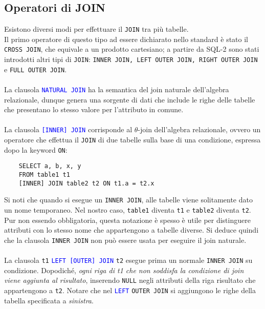 \documentclass[12pt,a4paper]{book}
\begin{document}
	\subsection{Operatori di JOIN}
	Esistono diversi modi per effettuare il \texttt{JOIN} tra più tabelle.\\
	Il primo operatore di questo tipo ad essere dichiarato nello standard è stato il \texttt{CROSS JOIN}, che equivale a un prodotto cartesiano; a partire da SQL-2 sono stati introdotti altri tipi di \texttt{JOIN}: \texttt{INNER JOIN, LEFT OUTER JOIN, RIGHT OUTER JOIN} e \texttt{FULL OUTER JOIN}.
	\paragraph{}La clausola \textcolor{blue}{\texttt{NATURAL JOIN}} ha la semantica del join naturale dell'algebra relazionale, dunque genera una sorgente di dati che include le righe delle tabelle che presentano lo stesso valore per l'attributo in comune.
	\paragraph{}La clausola \textcolor{blue}{\texttt{[INNER] JOIN}} corrisponde al $\theta$-join dell'algebra relazionale, ovvero un operatore che effettua il \texttt{JOIN} di due tabelle sulla base di una condizione, espressa dopo la keyword \texttt{ON}:
	\begin{lstlisting}
	SELECT a, b, x, y
	FROM table1 t1 
	[INNER] JOIN table2 t2 ON t1.a = t2.x
	\end{lstlisting}
	Si noti che quando si esegue un \texttt{INNER JOIN}, alle tabelle viene solitamente dato un nome temporaneo. Nel nostro caso, \texttt{table1} diventa \texttt{t1} e \texttt{table2} diventa \texttt{t2}. Pur non essendo obbligatoria, questa notazione è spesso è utile per distinguere attributi con lo stesso nome che appartengono a tabelle diverse. Si deduce quindi che la clausola \texttt{INNER JOIN} non può essere usata per eseguire il join naturale.
	\paragraph{}La clausola \texttt{t1} \textcolor{blue}{\texttt{LEFT [OUTER] JOIN}} \texttt{t2} esegue prima un normale \texttt{INNER JOIN} su condizione. Dopodiché, \textit{ogni riga di t1 che non soddisfa la condizione di join viene aggiunta al risultato}, inserendo \texttt{NULL} negli attributi della riga risultato che appartengono a \texttt{t2}. Notare che nel \textcolor{blue}{\texttt{LEFT}} \texttt{OUTER JOIN} si aggiungono le righe della tabella specificata a \textit{sinistra}.
\end{document}
